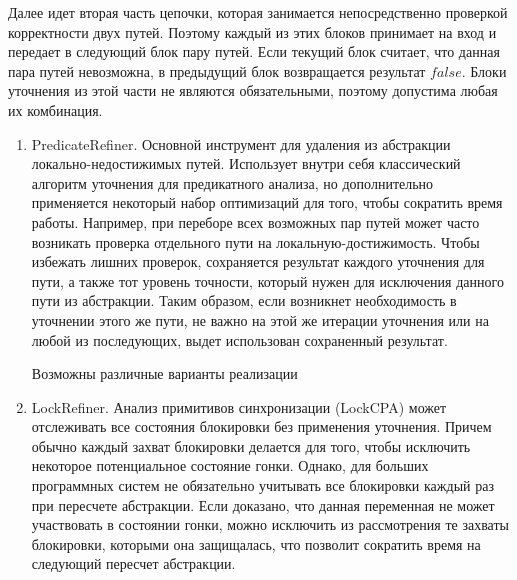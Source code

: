 Далее идет вторая часть цепочки, которая занимается непосредственно проверкой корректности двух путей.
Поэтому каждый из этих блоков принимает на вход и передает в следующий блок пару путей.
Если текущий блок считает, что данная пара путей невозможна, в предыдущий блок возвращается результат $false$.
Блоки уточнения из этой части не являются обязательными, поэтому допустима любая их комбинация.

\begin{enumerate}

\item PredicateRefiner. Основной инструмент для удаления из абстракции локально-недостижимых путей. 
Использует внутри себя классический алгоритм уточнения для предикатного анализа, но дополнительно применяется некоторый набор оптимизаций для того, чтобы сократить время работы.
Например, при переборе всех возможных пар путей может часто возникать проверка отдельного пути на локальную-достижимость. 
Чтобы избежать лишних проверок, сохраняется результат каждого уточнения для пути, а также тот уровень точности, который нужен для исключения данного пути из абстракции.
Таким образом, если возникнет необходимость в уточнении этого же пути, не важно на этой же итерации уточнения или на любой из последующих, выдет использован сохраненный результат. 

Возможны различные варианты реализации

\item LockRefiner. Анализ примитивов синхронизации (LockCPA) может отслеживать все состояния блокировки без применения уточнения.
Причем обычно каждый захват блокировки делается для того, чтобы исключить некоторое потенциальное состояние гонки.
Однако, для больших программных систем не обязательно учитывать все блокировки каждый раз при пересчете абстракции.
Если доказано, что данная переменная не может участвовать в состоянии гонки, можно исключить из рассмотрения те захваты блокировки, которыми она защищалась, что позволит сократить время на следующий пересчет абстракции.


\end{enumerate}

